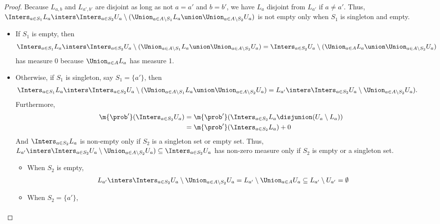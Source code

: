 \begin{proof}
      Because $L_{a,b}$ and $L_{a',b'}$ are disjoint as long as not
      $a = a'$ and $b = b'$,
      we have $L_a$ disjoint from $L_{a'}$ if $a \neq a'$.
      Thus,
      $\Inters_{a \in S_1} L_a \inters \Inters_{a \in S_2} U_a \setminus (\Union_{a \in A \setminus S_1} L_a \union \Union_{a \in A \setminus S_2} U_a)$
      is not empty only when $S_1$ is singleton and empty.
      \begin{itemize}
        \item If $S_1$ is empty,
      then
      \[
        \Inters_{a \in S_1} L_a \inters \Inters_{a \in S_2} U_a \setminus (\Union_{a \in A \setminus S_1} L_a \union \Union_{a \in A \setminus S_2} U_a)
        =  \Inters_{a \in S_2} U_a \setminus (\Union_{a \in A} L_a \union \Union_{a \in A \setminus S_2} U_a)
      \]
      has measure 0 because $\Union_{a \in A} L_a$ has measure 1.
        \item Otherwise, if $S_1$ is singleton, say $S_1 = \{a'\}$,
      then
      \begin{align*}
        \Inters_{a \in S_1} L_a \inters \Inters_{a \in S_2} U_a \setminus (\Union_{a \in A \setminus S_1} L_a \union \Union_{a \in A \setminus S_2} U_a)
        &= L_{a'} \inters \Inters_{a \in S_2} U_a \setminus \Union_{a \in A \setminus S_2} U_a).
      \end{align*}
Furthermore,
      \begin{align*}
        \m{\prob'}(\Inters_{a \in S_2} U_a)
        &= \m{\prob'}(\Inters_{a \in S_2} L_a \disjunion (U_a \setminus L_a)) \\
        &= \m{\prob'}(\Inters_{a \in S_2} L_a) + 0
      \end{align*}
      And $\Inters_{a \in S_2} L_a$ is non-empty only if
      $S_2$ is a singleton set or empty set.
      Thus, $L_{a'} \inters \Inters_{a \in S_2} U_a \setminus \Union_{a \in A \setminus S_2} U_a) \subseteq \Inters_{a \in S_2} U_a$ has non-zero measure only if
      $S_2$ is empty or a singleton set.
\begin{itemize}
        \item When $S_2$ is empty,
      \begin{align*}
        L_{a'} \inters \Inters_{a \in S_2} U_a \setminus \Union_{a \in A \setminus S_2} U_a
        &= L_{a'} \setminus \Union_{a \in A} U_a
        \subseteq L_{a'} \setminus  U_{a'}
        =\emptyset
      \end{align*}
        \item When $S_2 = \{a'\}$,
      \begin{align*}

\end{align*}
\end{itemize}
\end{itemize}
\end{proof}
